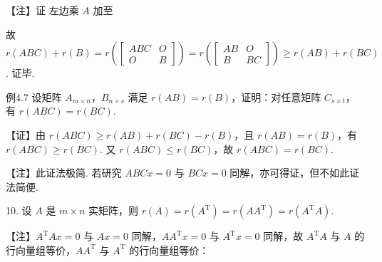 \begin{fnote}
【注】证 左边乘 $A$ 加至



故 $r(ABC)+r(B)=r\left(\begin{bmatrix}ABC&O\\O&B\end{bmatrix}\right)=r\left(\begin{bmatrix}AB&O\\B&BC\end{bmatrix}\right)\ge r(AB)+r(BC)$. 证毕.
\end{fnote}

\begin{fcard}{例4.7}
设矩阵 $A_{m\times n}$，$B_{n\times s}$ 满足 $r(AB)=r(B)$，证明：对任意矩阵 $C_{s\times t}$，有 $r(ABC)=r(BC)$.

【证】由 $r(ABC)\ge r(AB)+r(BC)-r(B)$，且 $r(AB)=r(B)$，有 $r(ABC)\ge r(BC)$. 又 $r(ABC)\le r(BC)$，故 $r(ABC)=r(BC)$.
\end{fcard}

\begin{fnote}
【注】此证法极简. 若研究 $ABCx=0$ 与 $BCx=0$ 同解，亦可得证，但不如此证法简便.
\end{fnote}

10. 设 $A$ 是 $m\times n$ 实矩阵，则 $r(A)=r(A^{\mathrm{T}})=r(AA^{\mathrm{T}})=r(A^{\mathrm{T}}A)$.

\begin{fnote}
【注】$A^{\mathrm{T}}Ax=0$ 与 $Ax=0$ 同解，$AA^{\mathrm{T}}x=0$ 与 $A^{\mathrm{T}}x=0$ 同解，故 $A^{\mathrm{T}}A$ 与 $A$ 的行向量组等价，$AA^{\mathrm{T}}$ 与 $A^{\mathrm{T}}$ 的行向量组等价：
\end{fnote}

